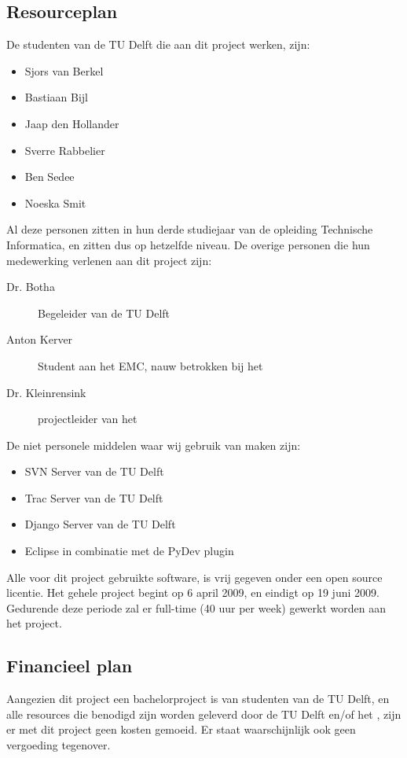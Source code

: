 \subsection{Resourceplan}
De studenten van de TU Delft die aan dit project werken, zijn:
\begin{itemize}
	\item Sjors van Berkel
	\item Bastiaan Bijl
	\item Jaap den Hollander
	\item Sverre Rabbelier
	\item Ben Sedee
	\item Noeska Smit
\end{itemize}
Al deze personen zitten in hun derde studiejaar van de opleiding Technische Informatica, en zitten dus op hetzelfde niveau. 
De overige personen die hun medewerking verlenen aan dit project zijn:
\begin{description}
	\item[Dr. Botha] Begeleider van de TU Delft
	\item[Anton Kerver] Student aan het EMC, nauw betrokken bij het \casamproject
	\item[Dr. Kleinrensink] projectleider van het \casamproject
\end{description}
De niet personele middelen waar wij gebruik van maken zijn:
\begin{itemize}
	\item SVN Server van de TU Delft
	\item Trac Server van de TU Delft
	\item Django Server van de TU Delft
	\item Eclipse in combinatie met de PyDev plugin
\end{itemize}
Alle voor dit project gebruikte software, is vrij gegeven onder een open source licentie.
Het gehele project begint op 6 april 2009, en eindigt op 19 juni 2009. 
Gedurende deze periode zal er full-time (40 uur per week) gewerkt worden aan het project.


\subsection{Financieel plan}
Aangezien dit project een bachelorproject is van studenten van de TU Delft, en alle resources die benodigd zijn worden geleverd door de TU Delft en/of het \casamproject, zijn er met dit project geen kosten gemoeid. Er staat waarschijnlijk ook geen vergoeding tegenover.
